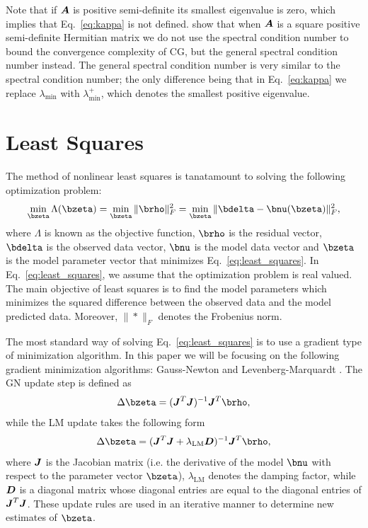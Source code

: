 \documentclass[useAMS,usenatbib]{mn2e}
\newcommand{\bA}{\bmath{A}}
\newcommand{\bJ}{\bmath{J}}
\newcommand{\bD}{\bmath{D}}
\begin{document}
Note that if $\bA$ is positive semi-definite its smallest eigenvalue is zero, which implies that Eq.~\eqref{eq:kappa} is not defined. \citet{Lu2015} show that when $\bA$
is a square positive semi-definite Hermitian matrix we do not use the spectral condition number to bound the convergence complexity of CG, but the general spectral condition
number instead. The general spectral condition number is very similar to the spectral condition number; the only difference being that in Eq.~\eqref{eq:kappa} we replace  
$\lambda_{\textrm{min}}$ with $\lambda_{\textrm{min}}^+$, which denotes the smallest positive eigenvalue. 

\section{Least Squares}
The method of nonlinear least squares is tanatamount to solving the following optimization problem:  
\begin{equation}
\label{eq:least_squares}
\min_{\bzeta} \Lambda(\bzeta) = \min_{\bzeta} \|\brho\|_F^2 = \min_{\bzeta} \|\bdelta - \bnu(\bzeta)\|_F^2, 
\end{equation}
where $\Lambda$ is known as the objective function, $\brho$ is the residual vector, $\bdelta$ is the observed data vector, $\bnu$ is the model data vector and $\bzeta$ is the model parameter vector that minimizes Eq.~\eqref{eq:least_squares}.
In Eq.~\eqref{eq:least_squares}, we assume that the optimization problem is real valued.
The main objective of least squares is to find the model parameters which minimizes the squared difference between the observed data and the model predicted data. Moreover, $\|*\|_F$ denotes the 
Frobenius norm.

The most standard way of solving Eq.~\eqref{eq:least_squares} is to use a gradient type of minimization algorithm. In this paper we will be focusing on the following gradient minimization algorithms: Gauss-Newton and Levenberg-Marquardt \citep{Levenberg1944,Marquardt1963}. 
The GN update step is defined as
\begin{equation}
 \Delta \bzeta = (\bJ^T\bJ)^{-1} \bJ^T\brho,
\end{equation}
while the LM update takes the following form
\begin{equation}
 \Delta \bzeta = (\bJ^T\bJ+\lambda_{\textrm{LM}}\bD)^{-1} \bJ^T\brho,
\end{equation}
where $\bJ$ is the Jacobian matrix (i.e. the derivative of the model $\bnu$ with respect to the parameter vector $\bzeta$), $\lambda_{\textrm{LM}}$ denotes the 
damping factor, while $\bD$ is a diagonal matrix whose diagonal entries are equal to the diagonal entries of $\bJ^T\bJ$. These update rules are used in an iterative manner to 
determine new estimates of $\bzeta$.
\end{document}
